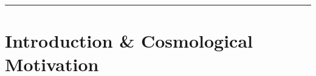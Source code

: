 \documentclass[11pt,a4paper]{article}
\begin{document}
\begin{abstract}
Theory and Penrose's Objective Reduction~\cite{PenroseOR1996,DonadiVIP2021}, and derive three falsifiable observational signatures for CMB low-$\ell$ multipoles, primordial gravitational wave parity, and weakening dynamical dark energy ($w_0 > -1, w_a < 0$)~\cite{DESI2024,DESI2025}.

\vspace{0.5em}
\noindent\textbf{Keywords:} Big Bang Cosmology, Complexified Minkowski Space, Twistor Theory, Vacuum Phase Transitions, Bubble Nucleation, Arrow of Time, Horizon Problem, Induced Gravity, Dirac Standing Waves, Dynamical Dark Energy
\end{abstract}

\hrule
\vspace{1em}

\section{Introduction \& Cosmological Motivation}
\end{document}
